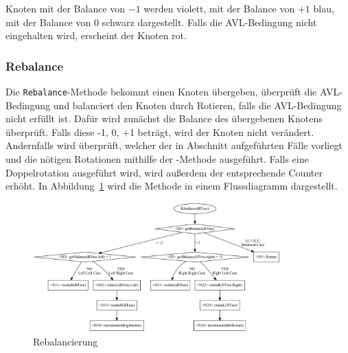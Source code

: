 Knoten mit der Balance von \(-1\) werden violett, mit der Balance von \(+1\)
blau, mit der Balance von \(0\) schwarz dargestellt.
Falls die AVL-Bedingung nicht eingehalten wird, erscheint der Knoten rot.

\subsubsection{Rebalance}\label{par:MethodRebalance}
Die \verb|Rebalance|-Methode bekommt einen Knoten übergeben, überprüft die AVL-Bedingung und
balanciert den Knoten durch Rotieren, falls die AVL-Bedingung nicht erfüllt ist.
Dafür wird zunächst die Balance des übergebenen Knotens überprüft.
Falls diese -1, 0, +1 beträgt, wird der Knoten nicht verändert.
Andernfalls wird überprüft, welcher der in Abschnitt  aufgeführten Fälle
vorliegt und die nötigen Rotationen mithilfe der -Methode ausgeführt.
Falls eine Doppelrotation ausgeführt wird, wird außerdem der entsprechende Counter erhöht.
In Abbildung~\ref{fig:rebalance} wird die Methode in einem Flussdiagramm dargestellt.
\begin{figure}[p]
    \centering
    \includegraphics[width = 0.85\textwidth]{img/gv/rebalance}
    \caption{Rebalancierung}
    \label{fig:rebalance}
\end{figure}


